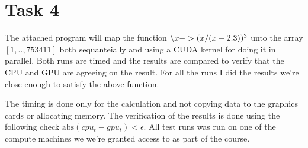 \section{Task 4}

The attached program will map the function $\symbol{92} x -> (x/(x-2.3))^3$ unto
the array $[1,..,753411]$ both sequanteially and using a CUDA kernel for doing
it in parallel. Both runs are timed and the results are compared to verify that
the CPU and GPU are agreeing on the result. For all the runs I did the results
we're close enough to satisfy the above function.

The timing is done only for the calculation and not copying data to the graphics
cards or allocating memory. The verification of the results is done using the
following check $\text{abs}(cpu_t - gpu_t) < \epsilon$. All test runs was run on
one of the compute machines we we're granted access to as part of the course.

